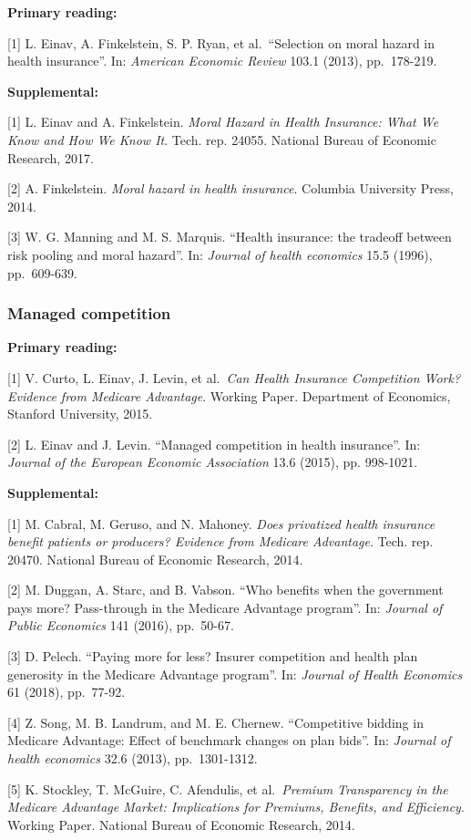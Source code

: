 \documentclass[11pt,]{article}
\begin{document}
\textbf{Primary reading:}

{[}1{]} L. Einav, A. Finkelstein, S. P. Ryan, et al.~``Selection on
moral hazard in health insurance''. In: \emph{American Economic Review}
103.1 (2013), pp.~178-219.

\textbf{Supplemental:}

{[}1{]} L. Einav and A. Finkelstein. \emph{Moral Hazard in Health
Insurance: What We Know and How We Know It}. Tech. rep. 24055. National
Bureau of Economic Research, 2017.

{[}2{]} A. Finkelstein. \emph{Moral hazard in health insurance}.
Columbia University Press, 2014.

{[}3{]} W. G. Manning and M. S. Marquis. ``Health insurance: the
tradeoff between risk pooling and moral hazard''. In: \emph{Journal of
health economics} 15.5 (1996), pp.~609-639.

\hypertarget{managed-competition}{%
\subsubsection{Managed competition}\label{managed-competition}}

\textbf{Primary reading:}

{[}1{]} V. Curto, L. Einav, J. Levin, et al.~\emph{Can Health Insurance
Competition Work? Evidence from Medicare Advantage}. Working Paper.
Department of Economics, Stanford University, 2015.

{[}2{]} L. Einav and J. Levin. ``Managed competition in health
insurance''. In: \emph{Journal of the European Economic Association}
13.6 (2015), pp. 998-1021.

\textbf{Supplemental:}

{[}1{]} M. Cabral, M. Geruso, and N. Mahoney. \emph{Does privatized
health insurance benefit patients or producers? Evidence from Medicare
Advantage}. Tech. rep. 20470. National Bureau of Economic Research,
2014.

{[}2{]} M. Duggan, A. Starc, and B. Vabson. ``Who benefits when the
government pays more? Pass-through in the Medicare Advantage program''.
In: \emph{Journal of Public Economics} 141 (2016), pp.~50-67.

{[}3{]} D. Pelech. ``Paying more for less? Insurer competition and
health plan generosity in the Medicare Advantage program''. In:
\emph{Journal of Health Economics} 61 (2018), pp.~77-92.

{[}4{]} Z. Song, M. B. Landrum, and M. E. Chernew. ``Competitive bidding
in Medicare Advantage: Effect of benchmark changes on plan bids''. In:
\emph{Journal of health economics} 32.6 (2013), pp.~1301-1312.

{[}5{]} K. Stockley, T. McGuire, C. Afendulis, et al.~\emph{Premium
Transparency in the Medicare Advantage Market: Implications for
Premiums, Benefits, and Efficiency}. Working Paper. National Bureau of
Economic Research, 2014.
\end{document}
